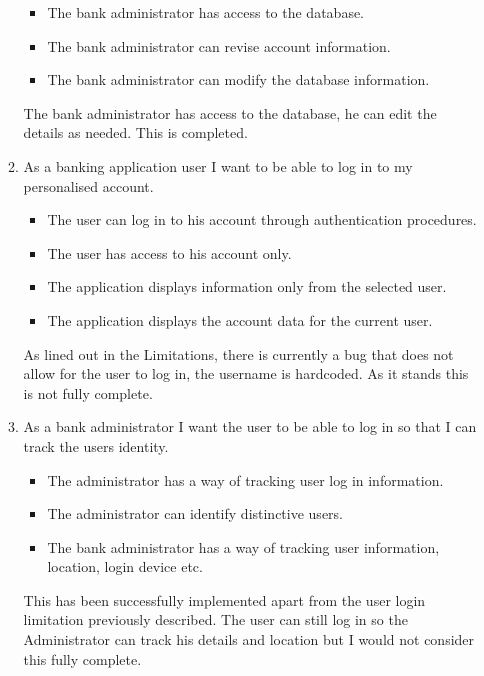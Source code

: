\begin{itemize}
\begin{enumerate}
        \begin{itemize}
                \item The bank administrator has access to the database.
                \item The bank administrator can revise account information.
                \item The bank administrator can modify the database information.
            \end{itemize}
            The bank administrator has access to the database, he can edit the details as needed. This is completed.
        \item As a banking application user I want to be able to log in to my personalised account.
        \begin{itemize}
                \item The user can log in to his account through authentication procedures.
                \item The user has access to his account only.
                \item The application displays information only from the selected user.
                \item The application displays the account data for the current user.
            \end{itemize}
            As lined out in the Limitations, there is currently a bug that does not allow for the user to log in, the username is hardcoded. As it stands this is not fully complete.
        \item As a bank administrator I want the user to be able to log in so that I can track the users identity.
            \begin{itemize}
                \item The administrator has a way of tracking user log in information.
                \item The administrator can identify distinctive users.
                \item The bank administrator has a way of tracking user information, location, login device etc.
            \end{itemize}
            This has been successfully implemented apart from the user login limitation previously described. The user can still log in so the Administrator can track his details and location but I would not consider this fully complete.


\end{enumerate}
\end{itemize}
